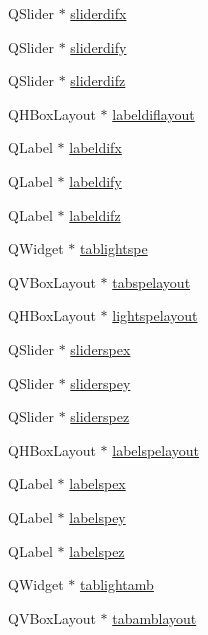 \begin{DoxyCompactItemize}
\item 
Q\+Slider $\ast$ \hyperlink{class_mondock_a1d4f04858d8142be0a35b1aad9f14345}{sliderdifx}
\item 
Q\+Slider $\ast$ \hyperlink{class_mondock_a61a2ab20f30425efa13abc19241dfcb7}{sliderdify}
\item 
Q\+Slider $\ast$ \hyperlink{class_mondock_af68d00a8f6995732dc8f5861b1b64de2}{sliderdifz}
\item 
Q\+H\+Box\+Layout $\ast$ \hyperlink{class_mondock_a2cc5ecc094ac129ac7cf6c70147b8d29}{labeldiflayout}
\item 
Q\+Label $\ast$ \hyperlink{class_mondock_adc2193f6756de65b0d3a3f5a3a0e7164}{labeldifx}
\item 
Q\+Label $\ast$ \hyperlink{class_mondock_ab869df2ebba1417ef476ae6df23084f3}{labeldify}
\item 
Q\+Label $\ast$ \hyperlink{class_mondock_ac4418e6866dac5b4917ed73f43ccbcaa}{labeldifz}
\item 
Q\+Widget $\ast$ \hyperlink{class_mondock_a99dad8f1fa710a564d0e8348e992372e}{tablightspe}
\item 
Q\+V\+Box\+Layout $\ast$ \hyperlink{class_mondock_af59762fb339ae8c0821fada75433e8fb}{tabspelayout}
\item 
Q\+H\+Box\+Layout $\ast$ \hyperlink{class_mondock_a9d565bf7d99d0dc112fedc26f21abf2d}{lightspelayout}
\item 
Q\+Slider $\ast$ \hyperlink{class_mondock_abd032f6caee1a61430b8f37fdf872c55}{sliderspex}
\item 
Q\+Slider $\ast$ \hyperlink{class_mondock_ab99848143e6941f878cb9328681d7690}{sliderspey}
\item 
Q\+Slider $\ast$ \hyperlink{class_mondock_a496a2a2470c9c96599cd491608544bf6}{sliderspez}
\item 
Q\+H\+Box\+Layout $\ast$ \hyperlink{class_mondock_ad034a6a1d416711fd87e9594a33d9ae4}{labelspelayout}
\item 
Q\+Label $\ast$ \hyperlink{class_mondock_a9dcd6eacb52a58adddd1f0118dc7fc66}{labelspex}
\item 
Q\+Label $\ast$ \hyperlink{class_mondock_a51f3374b36482300513cfaa0d9e7cb44}{labelspey}
\item 
Q\+Label $\ast$ \hyperlink{class_mondock_af00a5126b8b2d537b5a46064b4d26d76}{labelspez}
\item 
Q\+Widget $\ast$ \hyperlink{class_mondock_a9033d2049c8fcdc628ef06ea8cb192ca}{tablightamb}
\item 
Q\+V\+Box\+Layout $\ast$ \hyperlink{class_mondock_a73f30ee1b770ddf08cdb854136ab4e51}{tabamblayout}

\end{DoxyCompactItemize}
